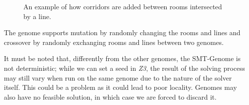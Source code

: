 \begin{figure}[hbt!]
    \centering
    \qquad
    \caption[SMT-Genome lines]{An example of how corridors are added between rooms intersected by a line.}
    \label{fig:smt_genome}
\end{figure}

The genome supports mutation by randomly changing the rooms and lines and crossover by randomly exchanging rooms and lines between two genomes.

It must be noted that, differently from the other genomes, the SMT-Genome is not deterministic; while we can set a seed in \textit{Z3}, the result of the solving process may still vary when run on the same genome due to the nature of the solver itself. This could be a problem as it could lead to poor locality. Genomes may also have no feasible solution, in which case we are forced to discard it.

